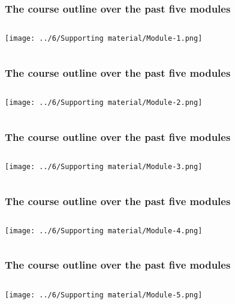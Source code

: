 \begin{frame}\frametitle{The course outline over the past five modules}
	\begin{columns}[T]
			\centerline{\texttt{[image: ../6/Supporting material/Module-1.png]}}
	\end{columns}
\end{frame}

\begin{frame}\frametitle{The course outline over the past five modules}
	\begin{columns}[T]
			\centerline{\texttt{[image: ../6/Supporting material/Module-2.png]}}
	\end{columns}
\end{frame}

\begin{frame}\frametitle{The course outline over the past five modules}
	\begin{columns}[T]
			\centerline{\texttt{[image: ../6/Supporting material/Module-3.png]}}
	\end{columns}
\end{frame}

\begin{frame}\frametitle{The course outline over the past five modules}
	\begin{columns}[T]
			\centerline{\texttt{[image: ../6/Supporting material/Module-4.png]}}
	\end{columns}
\end{frame}

\begin{frame}\frametitle{The course outline over the past five modules}
	\begin{columns}[T]
			\centerline{\texttt{[image: ../6/Supporting material/Module-5.png]}}
	\end{columns}
\end{frame}

